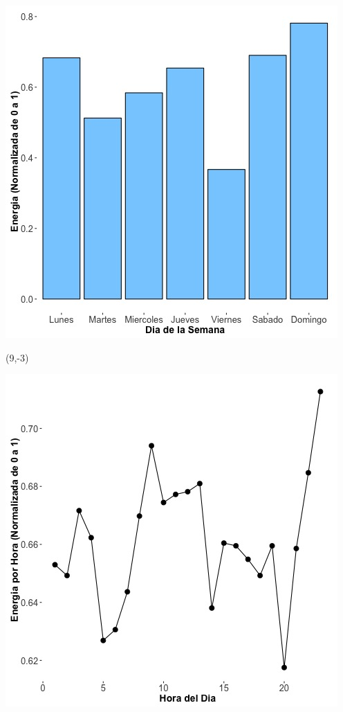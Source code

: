 \documentclass{article}\usepackage[]{graphicx}\usepackage[]{color}
\newenvironment{knitrout}{}{} %
\begin{document}
\begin{knitrout}
\color{fgcolor}
\includegraphics[scale=0.65]{figure/A20_day_of_week_plot} 
\end{knitrout}


 \begin{textblock}{1}(9,-3)
\begin{minipage}{20em}
\begingroup

\endgroup
\end{minipage}
\end{textblock}

 \vspace{2cm}

\begin{knitrout}
\color{fgcolor}
\includegraphics[scale=0.75]{figure/A20_fplot_norm_median} 
\end{knitrout}
\end{document}
